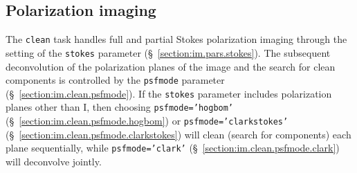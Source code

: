 % 
% 
% 
% 
% 

\subsection{Polarization imaging}
\label{section:im.clean.polarization}

The {\tt clean} task handles full and partial Stokes polarization
imaging through the setting of the {\tt stokes} parameter 
(\S~\ref{section:im.pars.stokes}).  The subsequent deconvolution of
the polarization planes of the image and the search for clean
components is controlled by the {\tt psfmode} parameter
(\S~\ref{section:im.clean.psfmode}).  If the {\tt stokes} parameter
includes polarization planes other than I, then choosing {\tt psfmode='hogbom'} 
(\S~\ref{section:im.clean.psfmode.hogbom}) or {\tt psfmode='clarkstokes'} 
(\S~\ref{section:im.clean.psfmode.clarkstokes}) will clean (search for
components) each plane sequentially, while {\tt psfmode='clark'} 
(\S~\ref{section:im.clean.psfmode.clark}) will deconvolve jointly.

